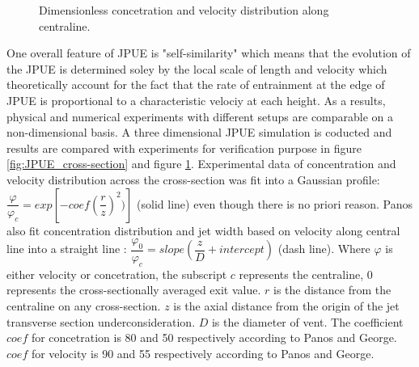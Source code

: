 \documentclass[10pt,a4paper]{article}
\begin{document}
\begin{figure}
\hfill
{}
\hfill
{}
\hfill
\caption{Dimensionless concetration and velocity distribution along centraline.}
\label{fig:JPUE_along-axis}
\end{figure}
One overall feature of JPUE is "self-similarity" which means that the evolution of the JPUE is determined soley by the local scale of length and velocity which theoretically account for the fact that the rate of entrainment at the edge of JPUE is proportional to a characteristic velociy at each height. As a results, physical and numerical experiments with different setups are comparable on a non-dimensional basis. A three dimensional JPUE simulation is coducted and results are compared with experiments \cite{papanicolaou1988investigations, george1977turbulence} for verification purpose in figure \ref{fig:JPUE_cross-section} and figure \ref{fig:JPUE_along-axis}. Experimental data of concentration and velocity distribution across the cross-section was fit into a Gaussian profile: $\dfrac{\varphi}{\varphi_c}=exp[-coef (\dfrac{r}{z})^2)]$ (solid line) even though there is no priori reason. Panos also fit concentration distribution and jet width based on velocity along central line into a straight line : $\dfrac{\varphi_0}{\varphi_c}=slope (\dfrac{z}{D} + intercept)$ (dash line). Where $\varphi$ is either velocity or concetration, the subscript $c$ represents the centraline, $0$ represents the cross-sectionally averaged exit value. $r$ is the distance from the centraline on any cross-section. $z$ is the axial distance from the origin of the jet transverse section underconsideration. $D$ is the diameter of vent. The coefficient $coef$ for concetration is 80 and 50 respectively according to Panos and George. $coef$ for velocity is 90 and 55 respectively according to Panos and George. 
\end{document}
